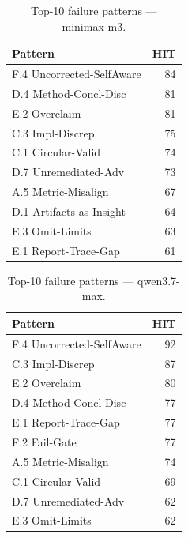 \begin{table}[H]
\centering\small
\caption{Top-10 failure patterns --- minimax-m3.}
\label{tab:top10_mmx}
\begin{tabular}{@{}lr@{}}
\toprule
Pattern & HIT \\
\midrule
F.4 Uncorrected-SelfAware & 84 \\
D.4 Method-Concl-Disc     & 81 \\
E.2 Overclaim             & 81 \\
C.3 Impl-Discrep          & 75 \\
C.1 Circular-Valid        & 74 \\
D.7 Unremediated-Adv      & 73 \\
A.5 Metric-Misalign       & 67 \\
D.1 Artifacts-as-Insight  & 64 \\
E.3 Omit-Limits           & 63 \\
E.1 Report-Trace-Gap      & 61 \\
\bottomrule
\end{tabular}

\end{table}

\begin{table}[H]
\centering\small
\caption{Top-10 failure patterns --- qwen3.7-max.}
\label{tab:top10_qwn}
\begin{tabular}{@{}lr@{}}
\toprule
Pattern & HIT \\
\midrule
F.4 Uncorrected-SelfAware & 92 \\
C.3 Impl-Discrep          & 87 \\
E.2 Overclaim             & 80 \\
D.4 Method-Concl-Disc     & 77 \\
E.1 Report-Trace-Gap      & 77 \\
F.2 Fail-Gate             & 77 \\
A.5 Metric-Misalign       & 74 \\
C.1 Circular-Valid        & 69 \\
D.7 Unremediated-Adv      & 62 \\
E.3 Omit-Limits           & 62 \\
\bottomrule
\end{tabular}

\end{table}

